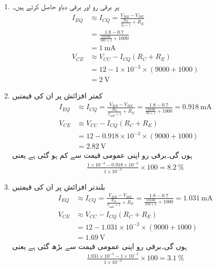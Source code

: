 \begin{enumerate}
\item
{} پر برقی رو اور برقی دباو حاصل کرتے ہیں۔
\begin{align*}
I_{EQ} &\approx I_{CQ} =\frac{V_{BB}-V_{BE}}{\frac{R_B}{\beta_0+1}+R_E}\\
&=\frac{1.8-0.7}{\frac{10100}{100+1}+1000}\\
&=\SI{1}{\milli \ampere}\\
V_{CE} &\approx V_{CC} -I_{CQ} \left (R_C+R_E \right ) \\
&=12-1 \times 10^{-3} \times \left (9000+1000 \right )\\
&=\SI{2}{\volt}
\end{align*}

\item
کمتر افزائش   پر ان کی قیمتیں
\begin{align*}
I_{EQ} &\approx I_{CQ} =\frac{V_{BB}-V_{BE}}{\frac{R_B}{\beta_\textrm{کمتر}+1}+R_E}=\frac{1.8-0.7}{\frac{10100}{50+1}+1000}=\SI{0.918}{\milli \ampere}\\
V_{CE} &\approx V_{CC} -I_{CQ} \left (R_C+R_E \right ) \\
&=12-0.918 \times 10^{-3} \times \left (9000+1000 \right )\\
&=\SI{2.82}{\volt}
\end{align*}
ہوں گی۔برقی رو اپنی عمومی قیمت سے   کم ہو گئی ہے یعنی
\begin{align*}
\frac{1 \times 10^{-3} -0.918 \times 10^{-3}}{1 \times 10^{-3}} \times 100 = \SI{8.2}{\percent}
\end{align*}

\item

بلندتر افزائش   پر ان کی قیمتیں
\begin{align*}
I_{EQ} & \approx I_{CQ} =\frac{V_{BB}-V_{BE}}{\frac{R_B}{\beta_\textrm{کمتر}+1}+R_E}=\frac{1.8-0.7}{\frac{10100}{150+1}+1000}=\SI{1.031}{\milli \ampere}\\
V_{CE} &\approx V_{CC} -I_{CQ} \left (R_C+R_E \right ) \\
&=12-1.031 \times 10^{-3} \times \left (9000+1000 \right )\\
&=\SI{1.69}{\volt} 
\end{align*}
ہوں گی۔برقی رو اپنی عمومی قیمت سے   بڑھ گئی ہے یعنی
\begin{align*}
\frac{1.031 \times 10^{-3} -1 \times 10^{-3}}{1 \times 10^{-3}} \times 100 = \SI{3.1}{\percent}
\end{align*}

\end{enumerate}


